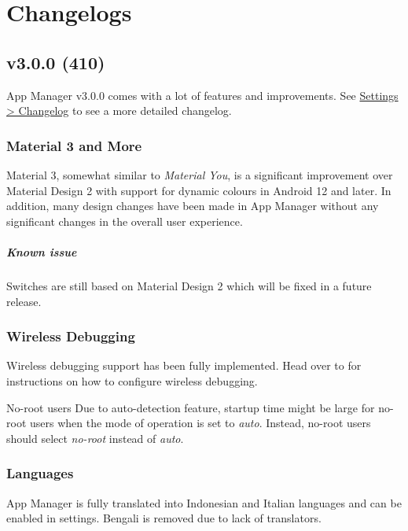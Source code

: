 \chapter{Changelogs}\label{ch:changelogs} %

\section{v3.0.0 (410)}\label{sec:v3.0.0-(410)}

App Manager v3.0.0 comes with a lot of features and improvements.
See \href{intent://settings/changelog#Intent;scheme=app-manager;end}{Settings > Changelog} to see a more detailed changelog.

\subsection{Material 3 and More}
Material 3, somewhat similar to \textit{Material You}, is a significant improvement over Material Design 2 with support for dynamic colours in Android 12 and later.
In addition, many design changes have been made in App Manager without any significant changes in the overall user experience.

\paragraph{Known issue} Switches are still based on Material Design 2 which will be fixed in a future release.

\subsection{Wireless Debugging}
Wireless debugging support has been fully implemented. Head over to  for instructions on how to configure wireless debugging.

\begin{tip}{No-root users}
    Due to auto-detection feature, startup time might be large for no-root users when the mode of operation is set to \textit{auto}.
    Instead, no-root users should select \textit{no-root} instead of \textit{auto}.
\end{tip}

\subsection{Languages}
App Manager is fully translated into Indonesian and Italian languages and can be enabled in settings. Bengali is removed due to lack of translators.


